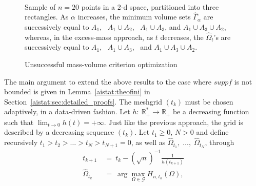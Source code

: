 \begin{center}
\begin{figure}[h!]
\centering
{}
\caption{Unsuccessful mass-volume criterion optimization}
\parbox{13cm}{~\\ \footnotesize Sample of $n=20$ points in a $2$-d space, partitioned into three rectangles.  As $\alpha$ increases, the minimum volume sets $\hat \Gamma_{\alpha}$ are successively equal to $A_1$,~ $A_1 \cup A_2$,~ $A_1 \cup A_3$, and $A_1 \cup A_3 \cup A_2$, whereas, in the excess-mass approach, as $t$ decreases, the $\hat \Omega_{t}$'s are successively equal to $A_1$,~ $A_1 \cup A_3$,~ and $A_1 \cup A_3 \cup A_2$.
}
\label{aistat:algo-problem}
\end{figure}
\end{center}


The main argument to extend the above results to the case where $supp f$ is not bounded is given in Lemma~\ref{aistat:theofini} in Section~\ref{aistat:sec:detailed_proofs}. The meshgrid $(t_k)$ must be chosen adaptively, in a data-driven fashion.  Let $h:~\mathbb{R}_+^* \rightarrow \mathbb{R}_+$ be a decreasing function such that $ \lim_{t \rightarrow 0}h(t)=+\infty$. Just like the previous approach, the grid is described by a decreasing sequence $(t_k)$. Let $t_1 \ge 0$, $N>0$ and define recursively $t_1>t_{2}>\ldots>t_{N}>t_{N+1}=0$, as well as $\hat \Omega_{t_1},\; \ldots,\;\hat \Omega_{t_N}$, through
\noindent
\begin{align}
\label{aistat:tk-omegak}t_{k+1}&~=~t_k -(\sqrt n)^{-1}\frac{1}{h(t_{k+1})}  \\ 
\label{aistat:tk1} \hat{\Omega}_{t_k}&~=~\arg\max_{\Omega \in \mathcal{G}} H_{n,t_k}(\Omega),
\end{align}

